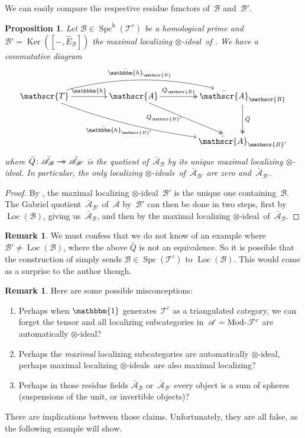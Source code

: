 \documentclass[JEP,XML,SOM,Unicode]{cedram}
\newenvironment{enumeratea}
{\bgroup\def\theenumi{\alph{enumi}}\begin{enumerate}}
{\end{enumerate}\egroup}
\newcommand{\onto}{\mathchoice{\to\hspace*{-5mm}\to}{\to\hspace*{-2.85mm}\to}{\to\hspace*{-3mm}\to}{\to\hspace*{-3mm}\to}}
\numberwithin{equation}{section}
\newtheorem{Prop}[equation]{Proposition}
\theoremstyle{definition}
\newtheorem{Rem}[equation]{Remark}
\DeclareMathOperator{\Ker}{Ker}
\DeclareMathOperator{\Spc}{Spc}
\newcommand{\cat}[1]{\mathscr{#1}}
\newcommand{\unit}{\mathbbm{1}}
\DeclareMathOperator{\Loc}{Loc}
\DeclareMathOperator{\Mod}{Mod}
\newcommand{\smallh}{\mathrm{h}}
\newcommand{\ABp}{\bar{\cA}_{\cB'}}
\newcommand{\AB}{\bar{\cA}_{\cB}}
\newcommand{\boneda}{\bar\yoneda}
\newcommand{\cA}{\cat{A}}
\newcommand{\cB}{\cat{B}}
\newcommand{\cT}{\cat{T}}
\newcommand{\hBp}{\boneda_{\cB'}}
\newcommand{\hB}{\boneda_{\cB}}
\newcommand{\hEB}{\hat E_{\cB}}
\newcommand{\Modd}{\Mod\text{\!-}}
\newcommand{\MT}{\Modd\cat T^c}
\newcommand{\SpchT}{\Spch(\cat{T}^c)}
\newcommand{\Spch}{\Spc^{\smallh}}
\newcommand{\SpcT}{\Spc(\cat{T}^c)}
\newcommand{\tensids}{$\otimes$\nobreakdash-ideals}
\newcommand{\tensid}{$\otimes$\nobreakdash-ideal}
\newcommand{\yoneda}{\mathbbm{h}}
\begin{document}
We can easily compare the respective residue functors of~$\cB$ and~$\cB'$.

\begin{Prop}
\label{Prop:hB-hBp}
Let $\cB\!\in\!\SpchT$ be a homological prime and ${\cB'}\!=\!\Ker([-,\hEB])$ the maximal localizing \tensid\ of . We have a commutative diagram
\begin{equation}
\label{eq:hB-hBp}
\vcenter{\xymatrix@C=1.5cm@R=1.2cm{
\cT \ar[r]^-{\yoneda} \ar@/^2em/[rr]^-{\hB} \ar@/_1em/[rrd]_-{\hBp}
& \cA \ar@{->>}[r]^-{Q_\cB} \ar@{->>}[rd]_(.35){Q_{\cB'}\!}
& \AB \ar@{->>}[d]^-{\bar Q}
\\
&& \ABp
}}
\end{equation}
where $\bar Q\colon \AB\onto \ABp$ is the quotient of~$\AB$ by its unique maximal localizing \tensid. In particular, the only localizing \tensids\ of~$\ABp$ are zero and~$\ABp$.
\end{Prop}

\begin{proof}
By , the maximal localizing \tensid\ ${\cB'}$ is the unique one containing~$\cB$. The Gabriel quotient~$\ABp$ of~$\cA$ by~${\cB'}$ can then be done in two steps, first by~$\Loc(\cB)$, giving us~$\AB$, and then by the maximal localizing \tensid\ of~$\AB$.
\end{proof}

\begin{Rem}
We must confess that we do not know of an example where $\cB'\neq\Loc(\cB)$, \ie where the above $\bar Q$ is not an equivalence. So it is possible that the construction of  simply sends $\cB\in\SpcT$ to $\Loc(\cB)$. This would come as a surprise to the author though.
\end{Rem}

\begin{Rem}
Here are some possible misconceptions:
\begin{enumeratea}
\item
\label{it:misc-a}
Perhaps when $\unit$ generates~$\cT^c$ as a triangulated category, we can forget the tensor and all localizing subcategories in~$\cA=\MT$ are automatically \tensid?
\item
Perhaps the \emph{maximal} localizing subcategories are automatically \tensid, \ie perhaps maximal localizing \tensids\ are also maximal localizing?
\item
Perhaps in those residue fields $\AB$ or~$\ABp$ every object is a sum of spheres (suspensions of the unit, or invertible objects)?
\end{enumeratea}

There are implications between those claims. Unfortunately, they are all false, as the following example will show.
\end{Rem}
\end{document}
